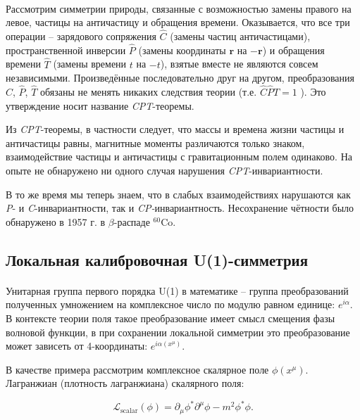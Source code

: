 \documentclass[a4paper,12pt]{article} %
\begin{document}
\paragraph{} Рассмотрим симметрии природы, связанные с возможностью замены правого на левое, частицы на античастицу и обращения времени. Оказывается, что все три операции -- зарядового сопряжения $\hat{C}$ (замены частиц античастицами), пространственной инверсии $\hat{P}$ (замены координаты $\mathbf{r}$ на $-\mathbf{r}$) и обращения времени $\hat{T}$ (замены времени $t$ на $-t$), взятые вместе не являются совсем независимыми. Произведённые последовательно друг на другом, преобразования $\hat{C}$, $\hat{P}$, $\hat{T}$ обязаны не менять никаких следствия теории (т.е. $\hat{C} \hat{P} \hat{T} = 1$ ). Это утверждение носит название \textit{CPT}-теоремы.

Из \textit{CPT}-теоремы, в частности следует, что массы и времена жизни частицы и античастицы равны, магнитные моменты различаются только знаком, взаимодействие частицы и античастицы с гравитационным полем одинаково. На опыте не обнаружено ни одного случая нарушения \textit{CPT}-инвариантности.

В то же время мы теперь знаем, что в слабых взаимодействиях нарушаются как \textit{P}-  и \textit{C}-инвариантности, так и \textit{CP-}инвариантность. Несохранение чётности было обнаружено в 1957 г. в $\beta$-распаде $^{60}$Co.

\subsection{Локальная калибровочная U(1)-симметрия} \label{ss:u1}

\paragraph{} Унитарная группа первого порядка U(1) в математике -- группа преобразований полученных умножением на комплексное число по модулю равном единице: $ e^{i \alpha} $. В контексте теории поля такое преобразование имеет смысл смещения фазы волновой функции, в при сохранении локальной симметрии это преобразование может зависеть от 4-координаты: $e^{i \alpha(x^\mu)}$. 

В качестве примера рассмотрим комплексное скалярное поле $\phi(x^\mu)$. Лагранжиан (плотность лагранжиана) скалярного поля: 

\begin{equation}
\mathcal{L}_\text{scalar}(\phi) = \partial_\mu \phi^* \partial^\mu \phi - m^2 \phi^* \phi.
\label{e:scal_field}
\end{equation}
\end{document}
